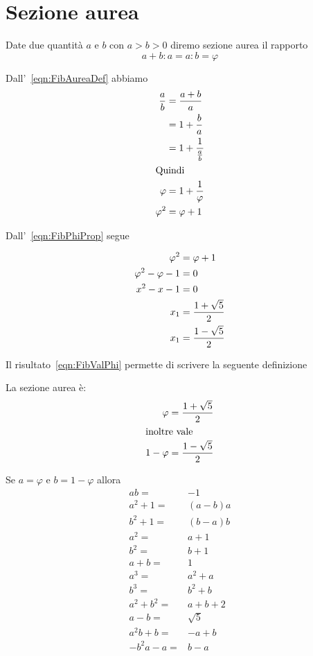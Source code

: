 \section{Sezione aurea}
\begin{defn}
	Date due quantità $a$ e $b$ con $a>b>0$ diremo sezione aurea il rapporto
	\begin{equation}
	a+b:a=a:b=\varphi	
	\end{equation}\label{eqn:FibAureaDef}
\end{defn}
\begin{prop}
	Dall'~\vref{eqn:FibAureaDef} abbiamo
	\begin{align}
		\dfrac{a}{b}={}&\dfrac{a+b}{a}\notag\\
		={}&1+\dfrac{b}{a}\notag\\
		={}&1+\dfrac{1}{\frac{a}{b}}\notag\\
		\intertext{Quindi}
		\varphi={}&1+\dfrac{1}{\varphi}\label{eqn:FibPhiProp}\\
		\varphi^2={}&\varphi+1\notag
	\end{align}
\end{prop}
	Dall'~\vref{eqn:FibPhiProp} segue
	\begin{prop}
	\begin{align}
		\varphi^2={}&\varphi+1\notag\\
		\varphi^2-\varphi-1={}&0\notag\\
		x^2-x-1={}&0\label{eqn:FibValPhiEqua}\\
		x_1={}&\dfrac{1+\sqrt{5}}{2}\label{eqn:FibValPhi}\\
		x_1={}&\dfrac{1-\sqrt{5}}{2}\notag
	\end{align}
\end{prop}
Il risultato~\ref{eqn:FibValPhi} permette di scrivere la seguente definizione
\begin{defn}
La sezione aurea è: 
\begin{align*}
	\varphi={}&\dfrac{1+\sqrt{5}}{2}\\
\intertext{inoltre vale}
	1-	\varphi={}&\dfrac{1-\sqrt{5}}{2}\\
\end{align*}
\end{defn}
\begin{lem}[Proprietà]\label{lem:FibpropPhi}
	Se $a=\varphi$ e  $b=1-\varphi$ allora
	\begin{align*}
		ab={}&-1\\
		a^2+1={}&(a-b)a\\
		b^2+1={}&(b-a)b\\
		a^2={}&a+1\\
		b^2={}&b+1\\
		a+b={}&1\\
		a^3={}&a^2+a\\
		b^3={}&b^2+b\\
		a^2+b^2={}&a+b+2\\
	a-b={}&\sqrt{5}\\
	a^2b+b={}&-a+b\\
	-b^2a-a={}&b-a\\
		\end{align*}
\end{lem}
